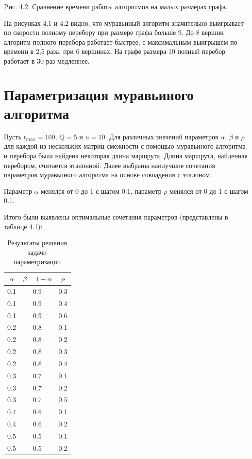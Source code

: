 \documentclass[12pt]{report}
\begin{document}
\begin{center}
Pис. 4.2. Сравнение времени работы алгоритмов на малых размерах графа.
\end{center}

На рисунках 4.1 и 4.2 видно, что муравьиный алгоритм значительно выигрывает по скорости полному перебору при размере графа больше 9.
До 8 вершин алгоритм полного перебора работает быстрее, с максимальным выигрышем по времени в 2,5 раза, при 6 вершинах.
На графе размера 10 полный перебор работает в 30 раз медленнее. 

\section{Параметризация муравьиного алгоритма}	

Пусть $t_{max} = 100$, $Q = 5$ и $n = 10$. Для различных значений параметров $\alpha$, $\beta$ и $\rho$ для каждой из нескольких матриц смежности с помощью муравьиного алгоритма и перебора была найдена некоторая длина маршрута. Длина маршрута, найденная перебором, считается эталонной. Далее выбраны наилучшие сочетания параметров муравьиного алгоритма на основе совпадения с эталоном.

Параметр $\alpha$ менялся от 0 до 1 с шагом 0.1, параметр $\rho$ менялся от 0 до 1 с шагом 0.1.

Итого были выявлены оптимальные сочетания параметров (представлены в таблице 4.1):

\begin{table}[H]
	\caption{Результаты решения задачи параметризации}
	\begin{center}
		
	\begin{tabular}{|c|c|c|}
		\hline
		$\alpha$ &$\beta = 1 - \alpha$ & $\rho$ \\\hline
		 
		0.1&0.9&0.3\\
		0.1&0.9&0.4\\
		0.1&0.9&0.6\\
		 
		0.2&0.8&0.1\\
		0.2&0.8&0.2\\
		0.2&0.8&0.3\\
		0.2&0.8&0.4\\
		 
		0.3&0.7&0.1\\
		0.3&0.7&0.2\\
		0.3&0.7&0.5\\
		 
		0.4&0.6&0.1\\
		0.4&0.6&0.2\\
		 
		0.5&0.5&0.1\\
		0.5&0.5&0.2\\
		\hline
	\end{tabular}
\end{center}
\end{table} 
\
\end{document}
